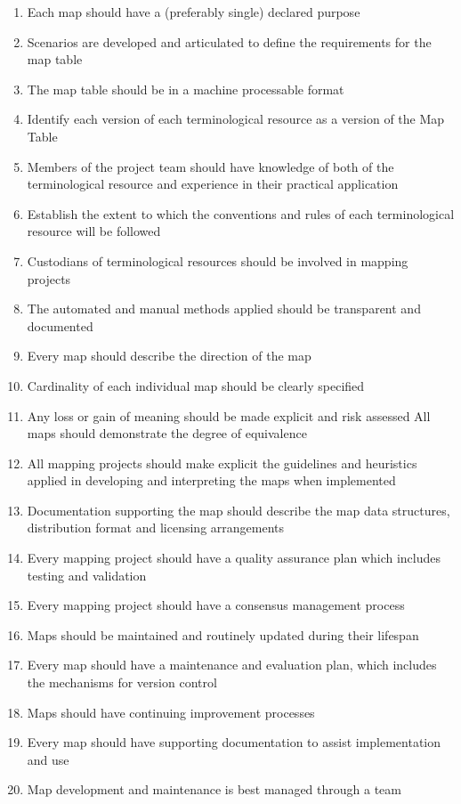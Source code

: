 \begin{enumerate}
\item Each map should have a (preferably single) declared purpose
\item Scenarios are developed and articulated to define the requirements for the map table
\item The map table should be in a machine processable format
\item Identify each version of each terminological resource as a version of the Map Table
\item Members of the project team should have knowledge of both of the terminological
resource and experience in their practical application
\item Establish the extent to which the conventions and rules of each terminological resource
will be followed
\item Custodians of terminological resources should be involved in mapping projects
\item The automated and manual methods applied should be transparent and documented
\item Every map should describe the direction of the map
\item Cardinality of each individual map should be clearly specified
\item Any loss or gain of meaning should be made explicit and risk assessed \newline
All maps should demonstrate the degree of equivalence
\item All mapping projects should make explicit the guidelines and heuristics applied in
developing and interpreting the maps when implemented
\item Documentation supporting the map should describe the map data structures, distribution
format and licensing arrangements
\item Every mapping project should have a quality assurance plan which includes testing and
validation
\item Every mapping project should have a consensus management process
\item Maps should be maintained and routinely updated during their lifespan
\item Every map should have a maintenance and evaluation plan, which includes the
mechanisms for version control
\item Maps should have continuing improvement processes
\item Every map should have supporting documentation to assist implementation and use
\item Map development and maintenance is best managed through a team
\end{enumerate}

